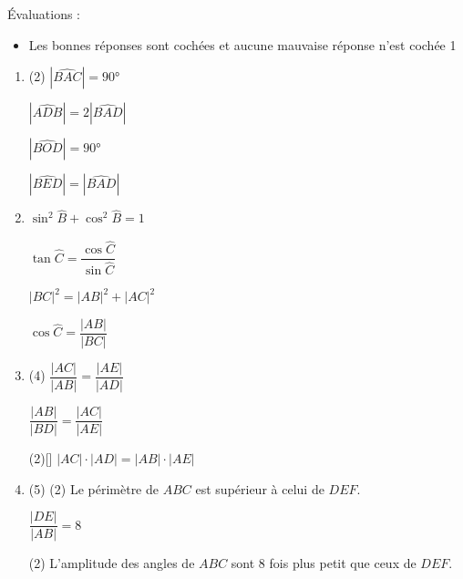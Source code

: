 \documentclass[a4paper, 12pt, parskip=half-, twoside=semi]{scrartcl}
\begin{document}
\begin{solution}
    Évaluations :
    \begin{itemize}
        \item Les bonnes réponses sont cochées et aucune mauvaise réponse n'est cochée \hfill 1
    \end{itemize}
    \begin{enumerate}
        \item
              \begin{QCM}(2)
                  \choice[\faCheckSquare]
                  $|\widehat{BAC}|=\ang{90}$

                  \choice
                  $|\widehat{ADB}| = 2|\widehat{BAD}|$

                  \choice
                  $|\widehat{BOD}| = \ang{90}$

                  \choice[\faCheckSquare]
                  $|\widehat{BED}| = |\widehat{BAD}|$
              \end{QCM}
        \item
              \begin{QCM}
                  \choice
                  [\faCheckSquare] $\sin^2\widehat{B} + \cos^2\widehat{B}=1$

                  \choice
                  $\tan\widehat{C} = \dfrac{\cos\widehat{C}}{\sin\widehat{C}}$

                  \choice
                  [\faCheckSquare] $|BC|^2 = |AB|^2 + |AC|^2$

                  \choice
                  $\cos\widehat{C}=\dfrac{|AB|}{|BC|}$
              \end{QCM}
        \item
              \begin{QCM}(4)
                  \choice[\faCheckSquare]
                  $\dfrac{|AC|}{|AB|}=\dfrac{|AE|}{|AD|}$

                  \choice
                  $\dfrac{|AB|}{|BD|}=\dfrac{|AC|}{|AE|}$

                  \choice*(2)[\faCheckSquare]
                  $|AC|\cdot |AD| = |AB| \cdot |AE|$
              \end{QCM}
        \item
              \begin{QCM}(5)
                  \choice*(2)
                  Le périmètre de $ABC$ est supérieur à celui de $DEF$.

                  \choice[\faCheckSquare]
                  $\dfrac{|DE|}{|AB|}=8$

                  \choice*(2)
                  L'amplitude des angles de $ABC$ sont 8 fois plus petit que ceux de $DEF$.
              \end{QCM}
    \end{enumerate}
\end{solution}
\end{document}
